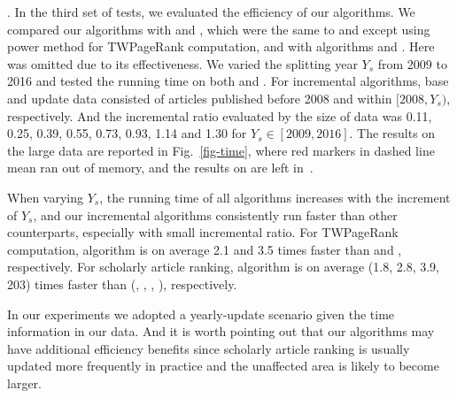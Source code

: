 .
In the third set of tests, we evaluated the efficiency of our algorithms.
%
We compared our algorithms with \powtwprscc and \powensemble, which were the same to \twprscc and \batensemble except using power method for TWPageRank computation, and with algorithms \futurerank and \hhgrank.
Here \pagerank was omitted due to its effectiveness.
%
We varied the splitting year $Y_s$ from 2009 to 2016 and tested the running time on both \aminer and \magdata.
%
For incremental algorithms, base and update data consisted of articles published before 2008 and within $[2008, Y_s)$, respectively. And the incremental ratio evaluated by the size of data was 0.11, 0.25, 0.39, 0.55, 0.73, 0.93, 1.14 and 1.30 for $Y_s\in[2009,2016]$.
%
The results on the large data \magdata are reported in Fig.~\ref{fig-time}, where red markers \marked{$\Box$} in dashed line mean \hhgrank ran out of memory, and the results on \aminer are left in~\cite{ERank-full}.

When varying $Y_s$, the running time of all algorithms increases with the increment of $Y_s$, and our incremental algorithms
consistently run faster than other counterparts, especially with small incremental ratio.
%
For TWPageRank computation, algorithm \inctwprscc is on average 2.1 and 3.5 times faster than \twprscc and \powtwprscc, respectively.
%
For scholarly article ranking, algorithm \incensemble is on average (1.8, 2.8, 3.9, 203) times faster than (\batensemble, \powensemble, \futurerank, \hhgrank), respectively.

In our experiments we adopted a yearly-update scenario given the time information in our data. And it is worth pointing out that our algorithms may have additional efficiency benefits since scholarly article ranking is usually updated more frequently in practice and the unaffected area is likely to become larger.




